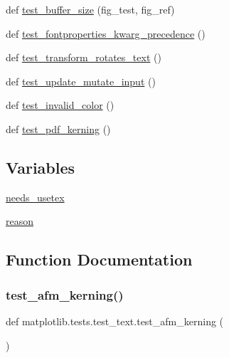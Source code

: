 \begin{DoxyCompactItemize}
\item 
def \hyperlink{namespacematplotlib_1_1tests_1_1test__text_a2bb87e673cc16a8e166814732b466191}{test\+\_\+buffer\+\_\+size} (fig\+\_\+test, fig\+\_\+ref)
\item 
def \hyperlink{namespacematplotlib_1_1tests_1_1test__text_a86ae623915cca5bf897f22e5f6c82429}{test\+\_\+fontproperties\+\_\+kwarg\+\_\+precedence} ()
\item 
def \hyperlink{namespacematplotlib_1_1tests_1_1test__text_a7838a6c360279429a97012faae4649e0}{test\+\_\+transform\+\_\+rotates\+\_\+text} ()
\item 
def \hyperlink{namespacematplotlib_1_1tests_1_1test__text_a8da9bb8b58a97aaa73d2a72695899575}{test\+\_\+update\+\_\+mutate\+\_\+input} ()
\item 
def \hyperlink{namespacematplotlib_1_1tests_1_1test__text_ad5c38fb7d134fd199635e190654ca480}{test\+\_\+invalid\+\_\+color} ()
\item 
def \hyperlink{namespacematplotlib_1_1tests_1_1test__text_a8bc3ebda0ab728e0f408a859b126d83c}{test\+\_\+pdf\+\_\+kerning} ()
\end{DoxyCompactItemize}
\subsection*{Variables}
\begin{DoxyCompactItemize}
\item 
\hyperlink{namespacematplotlib_1_1tests_1_1test__text_a812a50018821d5516f20608660f8c094}{needs\+\_\+usetex}
\item 
\hyperlink{namespacematplotlib_1_1tests_1_1test__text_a1c3d9079e7bbd0120927c348bd137e3b}{reason}
\end{DoxyCompactItemize}


\subsection{Function Documentation}
\mbox{\label{namespacematplotlib_1_1tests_1_1test__text_a28621164640f0a521864feaf47ced617}} 
\subsubsection{\texorpdfstring{test\+\_\+afm\+\_\+kerning()}{test\_afm\_kerning()}}
{\footnotesize\ttfamily def matplotlib.\+tests.\+test\+\_\+text.\+test\+\_\+afm\+\_\+kerning (\begin{DoxyParamCaption}{ }\end{DoxyParamCaption})}

